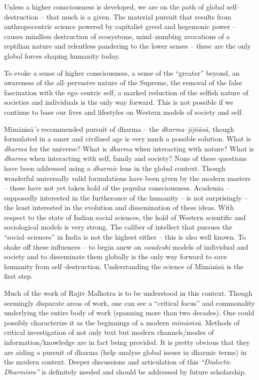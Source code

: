 Unless a higher consciousness is developed, we are on the path of global self–destruction – that much is a given. The material pursuit that results from anthropocentric science powered by capitalist greed and hegemonic power – causes mindless destruction of ecosystems, mind–numbing avocations of a reptilian nature and relentless pandering to the lower senses – these are the only global forces shaping humanity today.

To evoke a sense of higher consciousness, a sense of the “greater” beyond, an awareness of the all–pervasive nature of the Supreme, the removal of the false fascination with the ego–centric self, a marked reduction of the selfish nature of societies and individuals is the only way forward. This is not possible if we continue to base our lives and lifestyles on Western models of society and self.

Mīmāṁsā\textit{’s} recommended pursuit of dharma – the \textit{dharma–jijñāsā,} though formulated in a saner and civilized age is very much a possible solution. What is \textit{dharma} for the universe? What is \textit{dharma} when interacting with nature? What is \textit{dharma} when interacting with self, family and society? None of these questions have been addressed using a \textit{dharmic} lens in the global context. Though wonderful universally valid formulations have been given by the modern masters – these have not yet taken hold of the popular consciousness. Academia – supposedly interested in the furtherance of the humanity – is not surprisingly – the least interested in the evolution and dissemination of these ideas. With respect to the state of Indian social sciences, the hold of Western scientific and sociological models is very strong. The caliber of intellect that pursues the “social–sciences” in India is not the highest either – this is also well known. To shake off these influences – to begin anew on \textit{swadeshi} models of individual and society and to disseminate them globally is the only way forward to save humanity from self–destruction. Understanding the science of Mīmāṁsā is the first step.

Much of the work of Rajiv Malhotra is to be understood in this context. Though seemingly disparate areas of work, one can see a “critical focus” and commonality underlying the entire body of work (spanning more than two decades). One could possibly characterize it as the beginnings of a modern \textit{mimāṁsā}. Methods of critical investigation of not only text but modern channels/modes of information/knowledge are in fact being provided. It is pretty obvious that they are aiding a pursuit of dharma (help analyse global issues in dharmic terms) in the modern context. Deeper discussions and articulation of this \textit{“Dialectic Dharmism”} is definitely needed and should be addressed by future scholarship.


